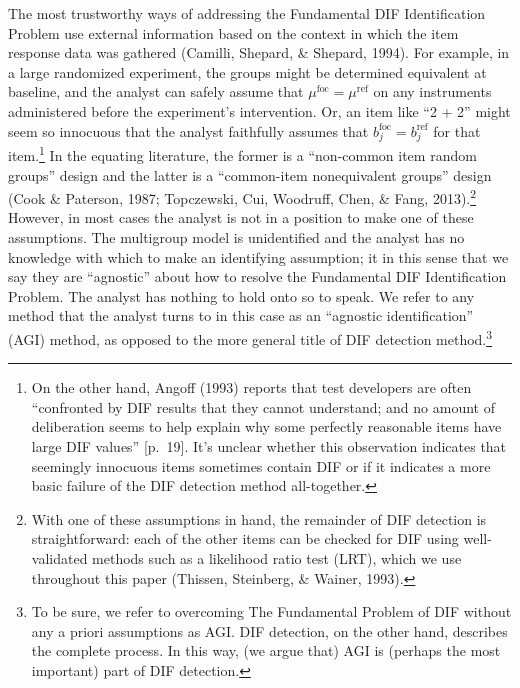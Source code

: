 \documentclass[
  english,
  man,floatsintext]{apa6}
\begin{document}
The most trustworthy ways of addressing the Fundamental DIF Identification Problem use external information based on the context in which the item response data was gathered (Camilli, Shepard, \& Shepard, 1994). For example, in a large randomized experiment, the groups might be determined equivalent at baseline, and the analyst can safely assume that \(\mu^{\text{foc}} = \mu^{\text{ref}}\) on any instruments administered before the experiment's intervention. Or, an item like ``2 + 2'' might seem so innocuous that the analyst faithfully assumes that \(b_j^{\text{foc}} = b_j^{\text{ref}}\) for that item.\footnote{On the other hand, Angoff (1993) reports that test developers are often ``confronted by DIF results that they cannot understand; and no amount of deliberation seems to help explain why some perfectly reasonable items have large DIF values'' {[}p.~19{]}. It's unclear whether this observation indicates that seemingly innocuous items sometimes contain DIF or if it indicates a more basic failure of the DIF detection method all-together.} In the equating literature, the former is a ``non-common item random groups'' design and the latter is a ``common-item nonequivalent groups'' design (Cook \& Paterson, 1987; Topczewski, Cui, Woodruff, Chen, \& Fang, 2013).\footnote{With one of these assumptions in hand, the remainder of DIF detection is straightforward: each of the other items can be checked for DIF using well-validated methods such as a likelihood ratio test (LRT), which we use throughout this paper (Thissen, Steinberg, \& Wainer, 1993).} However, in most cases the analyst is not in a position to make one of these assumptions. The multigroup model is unidentified and the analyst has no knowledge with which to make an identifying assumption; it in this sense that we say they are ``agnostic'' about how to resolve the Fundamental DIF Identification Problem. The analyst has nothing to hold onto so to speak. We refer to any method that the analyst turns to in this case as an ``agnostic identification'' (AGI) method, as opposed to the more general title of DIF detection method.\footnote{To be sure, we refer to overcoming The Fundamental Problem of DIF without any a priori assumptions as AGI. DIF detection, on the other hand, describes the complete process. In this way, (we argue that) AGI is (perhaps the most important) part of DIF detection.}
\end{document}
